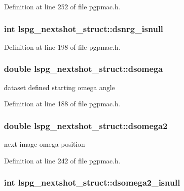 Definition at line 252 of file pgpmac.h.\hypertarget{structlspg__nextshot__struct_ad14d8bb50290ec12e58f4aaec5cc5aab}{
\subsubsection[{dsnrg\_\-isnull}]{\setlength{\rightskip}{0pt plus 5cm}int {\bf lspg\_\-nextshot\_\-struct::dsnrg\_\-isnull}}}
\label{structlspg__nextshot__struct_ad14d8bb50290ec12e58f4aaec5cc5aab}


Definition at line 198 of file pgpmac.h.\hypertarget{structlspg__nextshot__struct_a4be525bb32fb0232c21a91529f1e8c73}{
\subsubsection[{dsomega}]{\setlength{\rightskip}{0pt plus 5cm}double {\bf lspg\_\-nextshot\_\-struct::dsomega}}}
\label{structlspg__nextshot__struct_a4be525bb32fb0232c21a91529f1e8c73}


dataset defined starting omega angle 

Definition at line 188 of file pgpmac.h.\hypertarget{structlspg__nextshot__struct_a84ae35abfa725d1bdbff5403f6384ee4}{
\subsubsection[{dsomega2}]{\setlength{\rightskip}{0pt plus 5cm}double {\bf lspg\_\-nextshot\_\-struct::dsomega2}}}
\label{structlspg__nextshot__struct_a84ae35abfa725d1bdbff5403f6384ee4}


next image omega position 

Definition at line 242 of file pgpmac.h.\hypertarget{structlspg__nextshot__struct_afaf9bdf89a68e7f479969072643e55eb}{
\subsubsection[{dsomega2\_\-isnull}]{\setlength{\rightskip}{0pt plus 5cm}int {\bf lspg\_\-nextshot\_\-struct::dsomega2\_\-isnull}}}
\label{structlspg__nextshot__struct_afaf9bdf89a68e7f479969072643e55eb}


